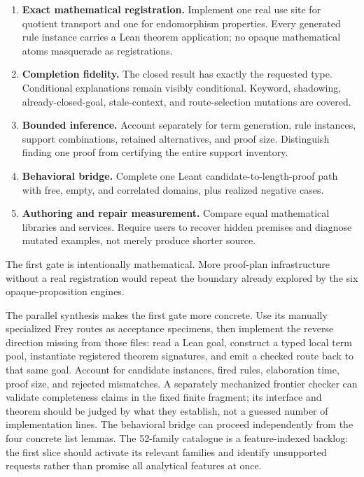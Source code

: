 \documentclass[11pt,letterpaper]{article}
\theoremstyle{definition}\newtheorem{definition}[proposition]{Definition}
\theoremstyle{remark}\newtheorem{remark}[proposition]{Remark}
\begin{document}
\begin{enumerate}
\item \textbf{Exact mathematical registration.} Implement one real use site
for quotient transport and one for endomorphism properties. Every generated
rule instance carries a Lean theorem application; no opaque mathematical
atoms masquerade as registrations.
\item \textbf{Completion fidelity.} The closed result has exactly the requested
type. Conditional explanations remain visibly conditional. Keyword, shadowing,
already-closed-goal, stale-context, and route-selection mutations are covered.
\item \textbf{Bounded inference.} Account separately for term generation,
rule instances, support combinations, retained alternatives, and proof size.
Distinguish finding one proof from certifying the entire support inventory.
\item \textbf{Behavioral bridge.} Complete one Leant candidate-to-length-proof
path with free, empty, and correlated domains, plus realized negative cases.
\item \textbf{Authoring and repair measurement.} Compare equal mathematical
libraries and services. Require users to recover hidden premises and diagnose
mutated examples, not merely produce shorter source.
\end{enumerate}
The first gate is intentionally mathematical. More proof-plan infrastructure
without a real registration would repeat the boundary already explored by
the six opaque-proposition engines.

The parallel synthesis makes the first gate more concrete. Use its manually
specialized Frey routes as acceptance specimens, then implement the reverse
direction missing from those files: read a Lean goal, construct a typed local
term pool, instantiate registered theorem signatures, and emit a checked route
back to that same goal. Account for candidate instances, fired rules, elaboration
time, proof size, and rejected mismatches. A separately mechanized frontier
checker can validate completeness claims in the fixed finite fragment; its
interface and theorem should be judged by what they establish, not a guessed
number of implementation lines. The behavioral bridge can proceed independently
from the four concrete list lemmas. The 52-family catalogue is a feature-indexed
backlog: the first slice should activate its relevant families and identify
unsupported requests rather than promise all analytical features at once.
\end{document}
